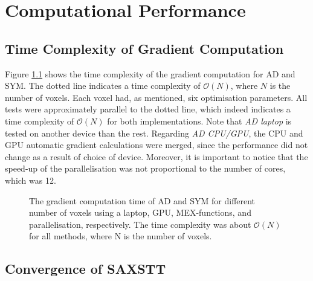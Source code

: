 \chapter{Computational Performance}



\section{Time Complexity of Gradient Computation}

Figure \ref{fig:gradient_time_complexity} shows the time complexity of the gradient computation for AD and SYM.
The dotted line indicates a time complexity of $\mathcal{O}(N)$, where $N$ is the number of voxels.
Each voxel had, as mentioned, six optimisation parameters.
All tests were approximately parallel to the dotted line, which indeed indicates a time complexity of $\mathcal{O}(N)$ for both implementations.
Note that \emph{AD laptop} is tested on another device than the rest.
Regarding \emph{AD CPU/GPU}, the CPU and GPU automatic gradient calculations were merged, since the performance did not change as a result of choice of device. %
Moreover, it is important to notice that the speed-up of the parallelisation was not proportional to the number of cores, which was 12.
\begin{figure}[h!]
    \centering
    
    \caption[Time Complexity of Gradient Computation]{ The gradient computation time of AD and SYM for different number of voxels using a laptop, GPU, MEX-functions, and parallelisation, respectively. %
        The time complexity was about $\mathcal{O}(N)$ for all methods, where N is the number of voxels.}
    \label{fig:gradient_time_complexity}
\end{figure}

\clearpage
\section{Convergence of SAXSTT}

